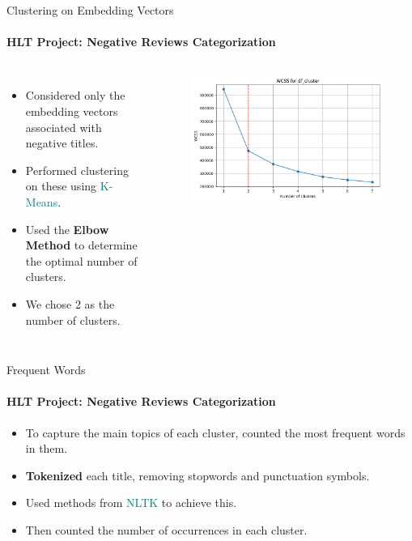 \documentclass{beamer}
\theoremstyle{definition}
\theoremstyle{plain}
\begin{document}
\begin{frame}{Clustering on Embedding Vectors}
\framesubtitle{HLT Project: Negative Reviews Categorization}
{\small

\begin{columns}
    \begin{itemize}
        \item Considered only the embedding vectors associated with negative titles.
        \item Performed clustering on these using \textcolor{teal}{K-Means}.
        \item Used the \textbf{Elbow Method} to determine the optimal number of clusters.
        \item We chose 2 as the number of clusters.
    \end{itemize}

    \begin{figure}
        \centering
        \includegraphics[scale=0.35]{Figures/elbow1.png}
    \end{figure}
\end{columns}
}
\end{frame}

\begin{frame}{Frequent Words}
\framesubtitle{HLT Project: Negative Reviews Categorization}
{\small
\begin{itemize}
    \item To capture the main topics of each cluster, counted the most frequent words in them.
    \item \textbf{Tokenized} each title, removing stopwords and punctuation symbols.
    \item Used methods from \textcolor{teal}{NLTK} to achieve this.
    \item Then counted the number of occurrences in each cluster.
\end{itemize}
}
\end{frame}
\end{document}
